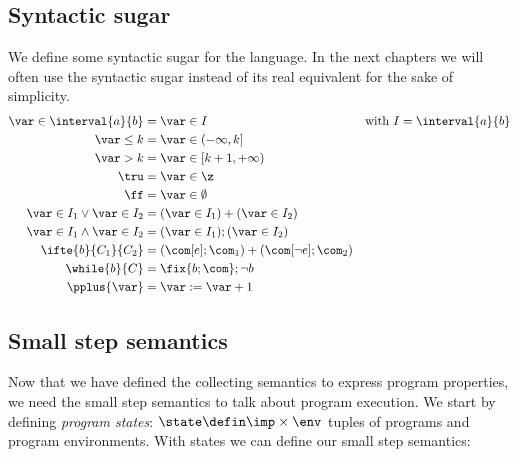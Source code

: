 \subsection{Syntactic sugar}\label{sub:sugar}
We define some syntactic sugar for the language. In the next chapters
we will often use the syntactic sugar instead of its real equivalent
for the sake of simplicity.
\begin{align*}
  \var \in \interval{a}{b} & = \var \in I & \text{with } I = \interval{a}{b}\\
  \var \leq k & = \var \in (-\infty, k]\\
  \var > k & = \var \in [k+1, + \infty) \\
  \tru & = \var \in \z \\
  \ff & = \var \in \emptyset \\
  \var \in I_1 \vee \var \in I_2 & = (\var \in I_1) + (\var \in I_2) \\ 
  \var \in I_1 \wedge \var \in I_2 & = (\var \in I_1);(\var \in I_2) \\
  \ifte{b}{C_1}{C_2} & = (\com[e];\com_1) + (\com[\neg e];\com_2) \\
  \while{b}{C} & = \fix{b;\com};\neg b \\
  \pplus{\var} & = \var := \var + 1
\end{align*}

\subsection{Small step semantics}\label{sub:sos}

Now that we have defined the collecting semantics to express program
properties, we need the small step semantics to talk about program
execution. We start by defining \emph{program states}:
\(\state \defin \imp \times \env\) tuples of programs and program
environments.  With states we can define our small step semantics:

